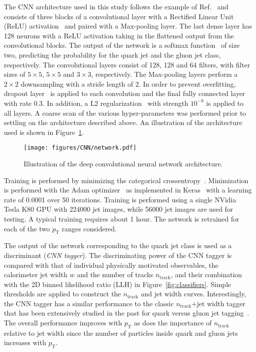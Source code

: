 The CNN architecture used in this study follows the example of Ref.~\cite{Komiske:2016rsd} and consists of three blocks of a convolutional layer with a
Rectified Linear Unit (ReLU) activation~\cite{RELU} and paired with a Max-pooling layer.
The last dense layer has 128 neurons with a ReLU activation taking in the flattened output from the convolutional blocks.
The output of the network is a softmax function~\cite{Goodfellow-et-al-2016-Book} of size two, 
predicting the probability for the quark jet and the gluon jet class, respectively. 
The convolutional layers consist of 128, 128 and 64 filters, with filter sizes of $5\times5$, $5\times5$ and $3\times3$, respectively.
The Max-pooling layers perform a $2\times2$ downsampling with a stride length of 2.
In order to prevent overfitting, dropout layer~\cite{Goodfellow-et-al-2016-Book} is applied to each convolution and the final fully connected layer with rate 0.3.
In addition, a L2 regularization~\cite{Goodfellow-et-al-2016-Book} with strength $10^{-8}$ is applied to all layers.  
A coarse scan of the various hyper-parameters was performed prior to settling on the architecture described above.
An illustration of the architecture used is shown in Figure~\ref{fig:networkarch}.

\begin{figure}[htpb]
\begin{center}
\texttt{[image: figures/CNN/network.pdf]}
\caption{Illustration of the deep convolutional neural network architecture.}
\label{fig:networkarch}
\end{center}
\end{figure}

Training is performed by minimizing the categorical crossentropy~\cite{Goodfellow-et-al-2016-Book}.
Minimization is performed with the Adam optimizer~\cite{DBLP:journals/corr/KingmaB14} 
as implemented in Keras~\cite{chollet2015keras} 
with a learning rate of 0.0001 over 50 iterations.
Training is performed using a single NVidia Tesla K80 GPU with 224000 jet images, while 56000 jet images are used for testing.
A typical training requires about 1 hour.
The network is retrained for each of the two $p_\text{T}$ ranges considered.

The output of the network corresponding to the quark jet class is used as a discriminant (\textit{CNN tagger}).
The discriminating power of the CNN tagger is compared with that of individual physically motivated observables, the calorimeter jet width $w$ and the number of tracks $n_\text{track}$, and their combination with the 2D binned likelihood ratio (LLH) in Figure~\ref{fig:classifiers}.  Simple thresholds are applied to construct the $n_\text{track}$ and jet width curves.  Interestingly, the CNN tagger has a similar performance to the classic $n_\text{track}$+jet width tagger that has been extensively studied in the past for quark versus gluon jet tagging~\cite{Aad:2014gea,ATLAS-CONF-2016-034}.  
The overall performance improves with $p_\text{T}$ as does the importance of $n_\text{track}$ relative to jet width since the number of particles inside quark and gluon jets increases with $p_\text{T}$.

